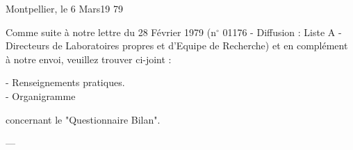 Montpellier, le 6 Mars\hfill 19 79

\begin{center}\end{center}

Comme suite à notre lettre du 28 Février 1979
(n$^\circ$ 01176 - Diffusion : Liste A - Directeurs de Laboratoires
propres et d'Equipe de Recherche) et en complément à notre
envoi, veuillez trouver ci-joint :

- Renseignements pratiques.\\
- Organigramme

concernant le "Questionnaire Bilan".

\begin{center}---\end{center}

